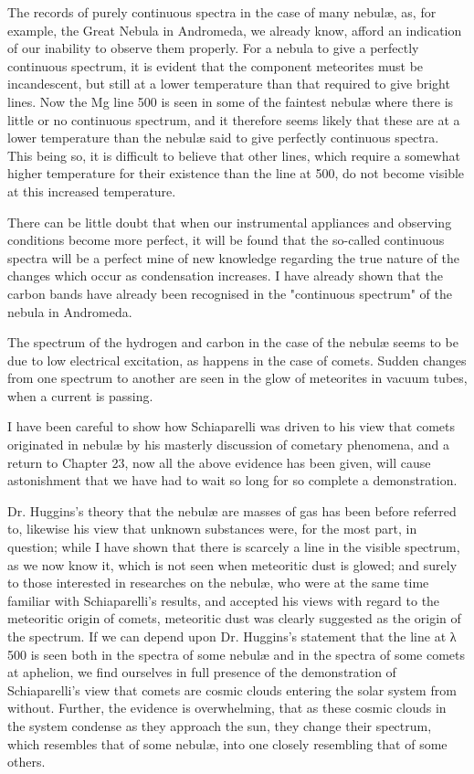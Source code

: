 \documentclass[a4paper, 12pt, oneside, polutonikogreek, english]{article}
\begin{document}
The records of purely continuous spectra in the case of many nebulæ, as, for example, the Great Nebula in Andromeda, we already know, afford an indication of our inability to observe them properly. For a nebula to give a perfectly continuous spectrum, it is evident that the component meteorites must be incandescent, but still at a lower temperature than that required to give bright lines. Now the Mg line 500 is seen in some of the faintest nebulæ where there is little or no continuous spectrum, and it therefore seems likely that these are at a lower temperature than the nebulæ said to give perfectly continuous spectra. This being so, it is difficult to believe that other lines, which require a somewhat higher temperature for their existence than the line at 500, do not become visible at this increased temperature.

There can be little doubt that when our instrumental appliances and observing conditions become more perfect, it will be found that the so-called continuous spectra will be a perfect mine of new knowledge regarding the true nature of the changes which occur as condensation increases. I have already shown that the carbon bands have already been recognised in the "continuous spectrum" of the nebula in Andromeda.

The spectrum of the hydrogen and carbon in the case of the nebulæ seems to be due to low electrical excitation, as happens in the case of comets. Sudden changes from one spectrum to another are seen in the glow of meteorites in vacuum tubes, when a current is passing.

I have been careful to show how Schiaparelli was driven to his view that comets originated in nebulæ by his masterly discussion of cometary phenomena, and a return to Chapter 23, now all the above evidence has been given, will cause astonishment that we have had to wait so long for so complete a demonstration.

Dr. Huggins's theory that the nebulæ are masses of gas has been before referred to, likewise his view that unknown substances were, for the most part, in question; while I have shown that there is scarcely a line in the visible spectrum, as we now know it, which is not seen when meteoritic dust is glowed; and surely to those interested in researches on the nebulæ, who were at the same time familiar with Schiaparelli's results, and accepted his views with regard to the meteoritic origin of comets, meteoritic dust was clearly suggested as the origin of the spectrum. If we can depend upon Dr. Huggins's statement that the line at λ 500 is seen both in the spectra of some nebulæ and in the spectra of some comets at aphelion, we find ourselves in full presence of the demonstration of Schiaparelli's view that comets are cosmic clouds entering the solar system from without. Further, the evidence is overwhelming, that as these cosmic clouds in the system condense as they approach the sun, they change their spectrum, which resembles that of some nebulæ, into one closely resembling that of some others.
\end{document}
